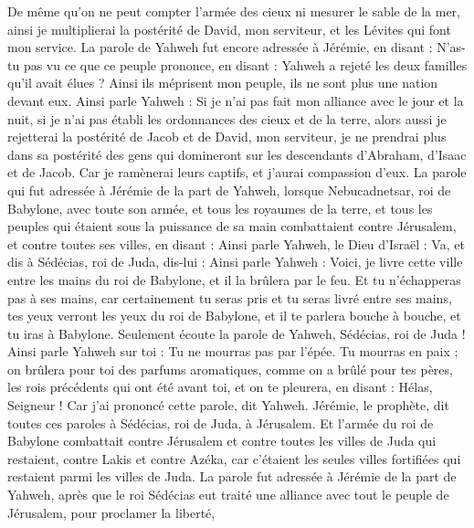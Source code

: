 \begin{multicols}{2}
De même qu'on ne peut compter l'armée des cieux ni mesurer le sable de la mer, ainsi je multiplierai la postérité de David, mon serviteur, et les Lévites qui font mon service.
La parole de Yahweh fut encore adressée à Jérémie, en disant :
N'as-tu pas vu ce que ce peuple prononce, en disant : Yahweh a rejeté les deux familles qu'il avait élues ? Ainsi ils méprisent mon peuple, ils ne sont plus une nation devant eux.
Ainsi parle Yahweh : Si je n'ai pas fait mon alliance avec le jour et la nuit, si je n'ai pas établi les ordonnances des cieux et de la terre,
alors aussi je rejetterai la postérité de Jacob et de David, mon serviteur, je ne prendrai plus dans sa postérité des gens qui domineront sur les descendants d'Abraham, d'Isaac et de Jacob. Car je ramènerai leurs captifs, et j'aurai compassion d'eux.
\VerseOne{}La parole qui fut adressée à Jérémie de la part de Yahweh, lorsque Nebucadnetsar, roi de Babylone, avec toute son armée, et tous les royaumes de la terre, et tous les peuples qui étaient sous la puissance de sa main combattaient contre Jérusalem, et contre toutes ses villes, en disant :
Ainsi parle Yahweh, le Dieu d'Israël : Va, et dis à Sédécias, roi de Juda, dis-lui : Ainsi parle Yahweh : Voici, je livre cette ville entre les mains du roi de Babylone, et il la brûlera par le feu.
Et tu n'échapperas pas à ses mains, car certainement tu seras pris et tu seras livré entre ses mains, tes yeux verront les yeux du roi de Babylone, et il te parlera bouche à bouche, et tu iras à Babylone.
Seulement écoute la parole de Yahweh, Sédécias, roi de Juda ! Ainsi parle Yahweh sur toi : Tu ne mourras pas par l'épée.
Tu mourras en paix ; on brûlera pour toi des parfums aromatiques, comme on a brûlé pour tes pères, les rois précédents qui ont été avant toi, et on te pleurera, en disant : Hélas, Seigneur ! Car j'ai prononcé cette parole, dit Yahweh.
Jérémie, le prophète, dit toutes ces paroles à Sédécias, roi de Juda, à Jérusalem.
Et l'armée du roi de Babylone combattait contre Jérusalem et contre toutes les villes de Juda qui restaient, contre Lakis et contre Azéka, car c'étaient les seules villes fortifiées qui restaient parmi les villes de Juda.
La parole fut adressée à Jérémie de la part de Yahweh, après que le roi Sédécias eut traité une alliance avec tout le peuple de Jérusalem, pour proclamer la liberté,

\end{multicols}
